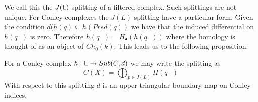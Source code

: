 We call this the $J({\mathsf L})$-splitting of a filtered complex.   Such splittings are not unique.  For Conley complexes the $J(L)$-splitting have a particular form.  Given the condition $d(h(q)\subseteq h(Pred(q))$ we have that the induced differential on $h(q_-)$ is zero.  Therefore $h(q_-) = H_\bullet(h(q_-))$ where the homology is thought of as an object of $Ch_0(k)$.  This leads us to the following proposition.




\begin{prop}
For a Conley complex $h:{\mathsf L}\to Sub(C,d)$ we may write the splitting as $$C(X) = \bigoplus_{p\in J(L)} H(q_-)$$ With respect to this splitting $d$ is an upper triangular boundary map on Conley indices.
\end{prop}










